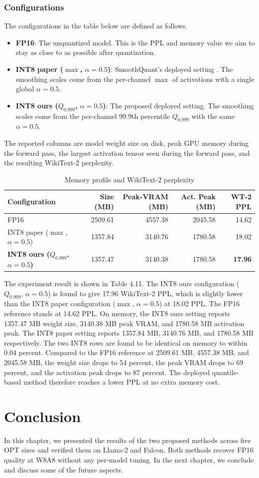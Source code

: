 \subsubsection*{Configurations}
The configurations in the table below are defined as follows.
\begin{itemize}
    \item \textbf{FP16}: The unquantized model. This is the PPL and memory value we aim to stay as close to as possible after quantization.
    \item \textbf{INT8 paper ($\max$, $\alpha=0.5$)}: SmoothQuant's deployed setting \cite{smoothquant_paper}. The smoothing scales come from the per-channel $\max$ of activations with a single global $\alpha=0.5$.
    \item \textbf{INT8 ours ($Q_{0.999}$, $\alpha=0.5$)}: The proposed deployed setting. The smoothing scales come from the per-channel 99.9th percentile $Q_{0.999}$ with the same $\alpha=0.5$.
\end{itemize}
The reported columns are model weight size on disk, peak GPU memory during the forward pass, the largest activation tensor seen during the forward pass, and the resulting WikiText-2 perplexity.

\begin{table}[h]
\centering
\begin{threeparttable}
\caption{Memory profile and WikiText-2 perplexity}
\begin{tabular}{lrrrr}
\hline
Configuration & Size (MB) & Peak-VRAM (MB)\tnote{1} & Act. Peak (MB)\tnote{2} & WT-2 PPL \\
\hline
FP16 & 2509.61 & 4557.38 & 2045.58 & 14.62 \\
INT8 paper ($\max$, $\alpha=0.5$) & 1357.84 & 3140.76 & 1780.58 & 18.02 \\
\textbf{INT8 ours ($Q_{0.999}$, $\alpha=0.5$)} & 1357.47 & 3140.38 & 1780.58 & \textbf{17.96} \\
\hline
\end{tabular}
\end{threeparttable}
\end{table}

The experiment result is shown in Table 4.11. The INT8 ours configuration ($Q_{0.999}$, $\alpha=0.5$) is found to give 17.96 WikiText-2 PPL, which is slightly lower than the INT8 paper configuration ($\max$, $\alpha=0.5$) at 18.02 PPL. The FP16 reference stands at 14.62 PPL. On memory, the INT8 ours setting reports 1357.47 MB weight size, 3140.38 MB peak VRAM, and 1780.58 MB activation peak. The INT8 paper setting reports 1357.84 MB, 3140.76 MB, and 1780.58 MB respectively. The two INT8 rows are found to be identical on memory to within 0.04 percent. Compared to the FP16 reference at 2509.61 MB, 4557.38 MB, and 2045.58 MB, the weight size drops to 54 percent, the peak VRAM drops to 69 percent, and the activation peak drops to 87 percent. The deployed quantile-based method therefore reaches a lower PPL at no extra memory cost.

\section{Conclusion}
In this chapter, we presented the results of the two proposed methods across five OPT sizes and verified them on Llama-2 and Falcon. Both methods recover FP16 quality at W8A8 without any per-model tuning. In the next chapter, we conclude and discuss some of the future aspects.

